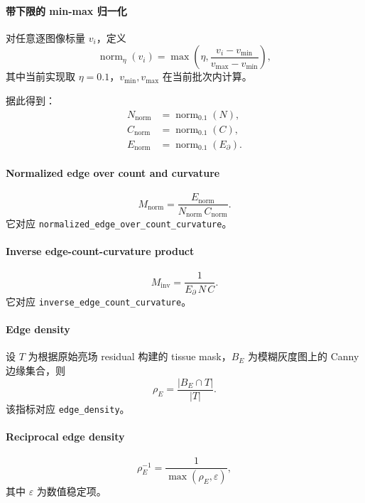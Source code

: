 \documentclass[11pt]{article}
\newcommand{\1}{\mathbf{1}}
\begin{document}
\paragraph{带下限的 min-max 归一化}
对任意逐图像标量 $v_i$，定义
\begin{equation}
\operatorname{norm}_{\eta}(v_i) = \max\left(\eta, \frac{v_i-v_{\min}}{v_{\max}-v_{\min}}\right),
\end{equation}
其中当前实现取 $\eta=0.1$，$v_{\min},v_{\max}$ 在当前批次内计算。

据此得到：
\begin{align}
N_{\mathrm{norm}} &= \operatorname{norm}_{0.1}(N),\\
C_{\mathrm{norm}} &= \operatorname{norm}_{0.1}(C),\\
E_{\mathrm{norm}} &= \operatorname{norm}_{0.1}(E_{\partial}).
\end{align}

\paragraph{Normalized edge over count and curvature}
\begin{equation}
M_{\mathrm{norm}} = \frac{E_{\mathrm{norm}}}{N_{\mathrm{norm}}\,C_{\mathrm{norm}}}.
\end{equation}
它对应 \texttt{normalized\_edge\_over\_count\_curvature}。

\paragraph{Inverse edge-count-curvature product}
\begin{equation}
M_{\mathrm{inv}} = \frac{1}{E_{\partial}\,N\,C}.
\end{equation}
它对应 \texttt{inverse\_edge\_count\_curvature}。

\paragraph{Edge density}
设 $T$ 为根据原始亮场 residual 构建的 tissue mask，$B_E$ 为模糊灰度图上的 Canny 边缘集合，则
\begin{equation}
\rho_E = \frac{|B_E \cap T|}{|T|}.
\end{equation}
该指标对应 \texttt{edge\_density}。

\paragraph{Reciprocal edge density}
\begin{equation}
\rho_E^{-1} = \frac{1}{\max(\rho_E,\varepsilon)},
\end{equation}
其中 $\varepsilon$ 为数值稳定项。
\end{document}
